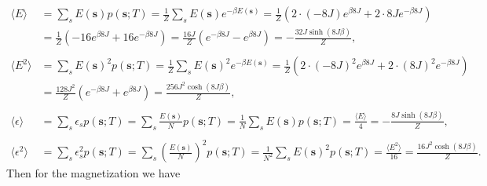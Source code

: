 \documentclass[english,notitlepage,reprint,nofootinbib]{revtex4-1}  %
\begin{document}
\begin{align*}
    \langle E \rangle &=  \sum_s E(\textbf{s})  p(\textbf{s};T) 
    = \frac{1}{Z} \sum_s E(\textbf{s})  e^{-\beta E(\textbf{s})} 
    = \frac{1}{Z} \left( 2 \cdot (-8J)e^{\beta8J} + 2 \cdot 8J e^{-\beta 8J}\right) \\
    &= \frac{1}{Z} \left( -16 e^{\beta8J} + 16 e^{-\beta 8J}\right)
    = \frac{16J}{Z} \left( e^{-\beta 8J} - e^{\beta 8J} \right)
    = - \frac{32 J \sinh(8J \beta )}{Z},
\\
\\
    \langle E^2 \rangle &=  \sum_s E(\textbf{s})^2  p(\textbf{s};T)
    = \frac{1}{Z} \sum_s E(\textbf{s})^2  e^{-\beta E(\textbf{s})} 
    = \frac{1}{Z} \left( 2 \cdot (-8J)^2e^{\beta8J} + 2 \cdot (8J)^2 e^{-\beta 8J}\right) \\
    &= \frac{128 J^2}{Z} \left( e^{-\beta 8J} + e^{\beta 8J} \right)
    = \frac{256 J^2 \cosh(8J \beta)}{Z},
\\
\\
    \langle \epsilon \rangle &=  \sum_s \epsilon_s  p(\textbf{s};T)
    =  \sum_s \frac{E(\textbf{s})}{N}  p(\textbf{s};T)
    =  \frac{1}{N} \sum_s E(\textbf{s})  p(\textbf{s};T)
    =  \frac{\langle E \rangle }{4}
    = - \frac{8J \sinh(8J \beta)}{Z},
\\
\\
    \langle \epsilon^2 \rangle &=  \sum_s \epsilon_s^2  p(\textbf{s};T)
    =  \sum_s \left(\frac{E(\textbf{s})}{N}\right)^2  p(\textbf{s};T) 
    =  \frac{1}{N^2} \sum_s E(\textbf{s})^2  p(\textbf{s};T)
    =  \frac{\langle E^2 \rangle }{16}
    = \frac{16 J^2 \cosh(8J \beta)}{Z}.
\end{align*}
Then for the magnetization we have
\end{document}
